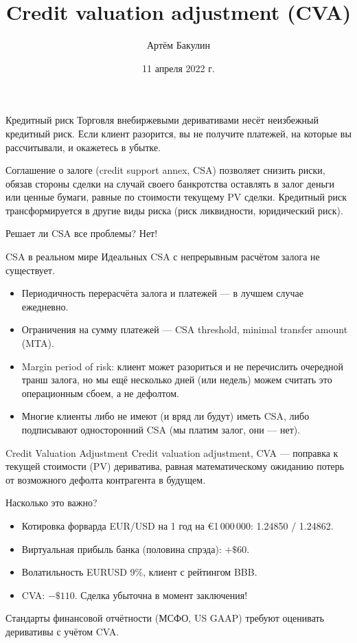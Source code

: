 \documentclass{beamer}
\title{Credit valuation adjustment (CVA)}
\author{Артём Бакулин}
\date{11 апреля 2022 г.}
\begin{document}
\begin{frame}
\titlepage
\end{frame}




\begin{frame}{Кредитный риск}
\justify
Торговля внебиржевыми деривативами несёт неизбежный кредитный риск. Если клиент разорится, вы не получите платежей, на которые вы рассчитывали, и окажетесь в убытке.

\vspace{\baselineskip}
Соглашение о залоге (credit support annex, CSA) позволяет снизить риски, обязав стороны сделки на случай своего банкротства оставлять в залог деньги или ценные бумаги, равные по стоимости текущему PV сделки. Кредитный риск трансформируется в другие виды риска (риск ликвидности, юридический риск).

\vspace{\baselineskip}
Решает ли CSA все проблемы? Нет!
\end{frame}

\begin{frame}{CSA в реальном мире}
\justify
Идеальных CSA с непрерывным расчётом залога не существует.
\begin{itemize}
\justifying
\item Периодичность перерасчёта залога и платежей --- в лучшем случае ежедневно.
\item Ограничения на сумму платежей --- CSA threshold, minimal transfer amount (MTA).
\item Margin period of risk: клиент может разориться и не перечислить очередной транш залога, но мы ещё несколько дней (или недель) можем считать это операционным сбоем, а не дефолтом.
\item Многие клиенты либо не имеют (и вряд ли будут) иметь CSA, либо подписывают односторонний CSA (мы платим залог, они --- нет).
\end{itemize}
\end{frame}



\begin{frame}{Credit Valuation Adjustment}
\justify
Credit valuation adjustment, CVA --- поправка к текущей стоимости (PV) дериватива, равная математическому ожиданию потерь от возможного дефолта контрагента в будущем.

\vspace{\baselineskip}
Насколько это важно?
\begin{itemize}
\item Котировка форварда EUR/USD на 1 год на \euro 1\,000\,000: 1.24850 / 1.24862.
\item Виртуальная прибыль банка (половина спрэда): \alert{$+\$60$}.
\item Волатильность EURUSD 9\%, клиент с рейтингом BBB.
\item CVA: \alert{$-\$110$}. Сделка убыточна в момент заключения!
\end{itemize}

\vspace{\baselineskip}
Стандарты финансовой отчётности (МСФО, US GAAP) требуют оценивать деривативы с учётом CVA.
\end{frame}
\end{document}
